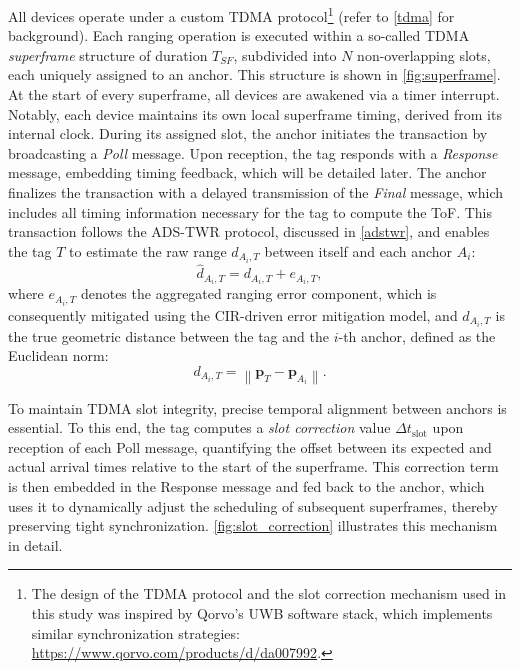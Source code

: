 All devices operate under a custom TDMA protocol\footnote{The design of the TDMA protocol and the slot correction mechanism used in this study was inspired by Qorvo's UWB software stack, which implements similar synchronization strategies: \url{https://www.qorvo.com/products/d/da007992}.} (refer to \autoref{tdma} for background). Each ranging operation is executed within a so-called TDMA \emph{superframe} structure of duration $T_{SF}$, subdivided into $N$ non-overlapping slots, each uniquely assigned to an anchor. This structure is shown in \autoref{fig:superframe}. At the start of every superframe, all devices are awakened via a timer interrupt. Notably, each device maintains its own local superframe timing, derived from its internal clock. During its assigned slot, the anchor initiates the transaction by broadcasting a \emph{Poll} message. Upon reception, the tag responds with a \emph{Response} message, embedding timing feedback, which will be detailed later. The anchor finalizes the transaction with a delayed transmission of the \emph{Final} message, which includes all timing information necessary for the tag to compute the ToF. This transaction follows the ADS-TWR protocol, discussed in \autoref{adstwr}, and enables the tag $T$ to estimate the raw range $\hat{d}_{A_i,T}$ between itself and each anchor $A_i$:
\begin{equation}
\hat{d}_{A_i,T} = d_{A_i,T} + e_{A_i,T},\label{eq:raw_range}
\end{equation}
where $e_{A_i,T}$ denotes the aggregated ranging error component, which is consequently mitigated using the CIR-driven error mitigation model, and $d_{A_i,T}$ is the true geometric distance between the tag and the $i$-th anchor, defined as the Euclidean norm:
\begin{equation} 
d_{A_i,T} = \left\| \mathbf{p}_T - \mathbf{p}_{A_i} \right\|.\label{eq:true_distance} 
\end{equation}

To maintain TDMA slot integrity, precise temporal alignment between anchors is essential. To this end, the tag computes a \textit{slot correction} value $\Delta t_{\text{slot}}$ upon reception of each Poll message, quantifying the offset between its expected and actual arrival times relative to the start of the superframe. This correction term is then embedded in the Response message and fed back to the anchor, which uses it to dynamically adjust the scheduling of subsequent superframes, thereby preserving tight synchronization. \autoref{fig:slot_correction} illustrates this mechanism in detail.

